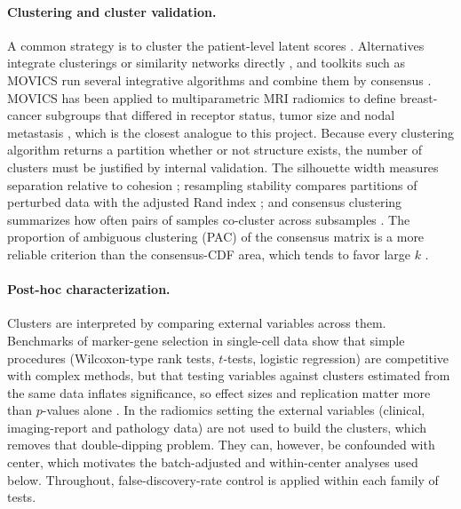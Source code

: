 \paragraph{Clustering and cluster validation.}
A common strategy is to cluster the patient-level latent scores
\citep{shen2009icluster,hellton2016integrative}. Alternatives integrate
clusterings or similarity networks directly
\citep{kirk2012bayesian,lock2013consensus,gabasova2017clusternomics,wang2014snf},
and toolkits such as MOVICS run several integrative algorithms and combine
them by consensus \citep{lu2020movics}. MOVICS has been applied to
multiparametric MRI radiomics to define breast-cancer subgroups that differed
in receptor status, tumor size and nodal metastasis \citep{he2024integrative},
which is the closest analogue to this project. Because every clustering
algorithm returns a partition whether or not structure exists, the number of
clusters must be justified by internal validation. The silhouette width
measures separation relative to cohesion \citep{rousseeuw1987silhouettes};
resampling stability compares partitions of perturbed data with the adjusted
Rand index \citep{hubert1985comparing,lange2004stability}; and consensus
clustering summarizes how often pairs of samples co-cluster across
subsamples \citep{monti2003consensus}. The proportion of ambiguous clustering
(PAC) of the consensus matrix is a more reliable criterion than the
consensus-CDF area, which tends to favor large $k$
\citep{senbabaoglu2014critical}.

\paragraph{Post-hoc characterization.}
Clusters are interpreted by comparing external variables across them.
Benchmarks of marker-gene selection in single-cell data show that simple
procedures (Wilcoxon-type rank tests, $t$-tests, logistic regression) are
competitive with complex methods, but that testing variables against
clusters estimated from the same data inflates significance, so effect sizes
and replication matter more than $p$-values alone
\citep{pullin2024comparison}. In the radiomics setting the external
variables (clinical, imaging-report and pathology data) are not used to build
the clusters, which removes that double-dipping problem. They can, however, be
confounded with center, which motivates the batch-adjusted and
within-center analyses used below. Throughout, false-discovery-rate control
\citep{benjamini1995fdr} is applied within each family of tests.

